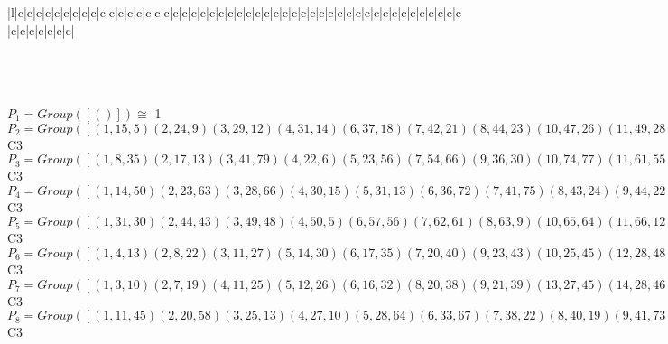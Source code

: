 \documentclass[varwidth=\maxdimen,border=10]{standalone}
\begin{document}
\begin{tabular}
\begin{array}{|l|c|c|c|c|c|c|c|c|c|c|c|c|c|c|c|c|c|c|c|c|c|c|c|c|c|c|c|c|c|c|c|c|c|c|c|c|c|c|c|c|c|c|c|c|c|c|c|c|c|c|c|c|c|c|c|c|}
\end{array}\)\\
\ \\
\ \\
$P_{1} = Group( [ () ] )\cong$ 1\ \\
$P_{2} = Group( [ ( 1,15, 5)( 2,24, 9)( 3,29,12)( 4,31,14)( 6,37,18)( 7,42,21)( 8,44,23)(10,47,26)(11,49,28)(13,50,30)(16,55,34)(17,57,36)(19,60,39)(20,62,41)(22,63,43)(25,65,46)(27,66,48)(32,69,52)(33,71,54)(35,72,56)(38,74,59)(40,75,61)(45,76,64)(51,78,68)(53,79,70)(58,80,73)(67,81,77) ] )\cong$ C3\ \\
$P_{3} = Group( [ ( 1, 8,35)( 2,17,13)( 3,41,79)( 4,22, 6)( 5,23,56)( 7,54,66)( 9,36,30)(10,74,77)(11,61,55)(12,62,53)(14,43,18)(15,44,72)(16,28,75)(19,78,64)(20,70,29)(21,71,27)(24,57,50)(25,80,52)(26,38,81)(31,63,37)(32,65,73)(33,48,42)(34,49,40)(39,51,76)(45,60,68)(46,58,69)(47,59,67) ] )\cong$ C3\ \\
$P_{4} = Group( [ ( 1,14,50)( 2,23,63)( 3,28,66)( 4,30,15)( 5,31,13)( 6,36,72)( 7,41,75)( 8,43,24)( 9,44,22)(10,46,76)(11,48,29)(12,49,27)(16,54,79)(17,56,37)(18,57,35)(19,59,80)(20,61,42)(21,62,40)(25,64,47)(26,65,45)(32,68,81)(33,70,55)(34,71,53)(38,73,60)(39,74,58)(51,77,69)(52,78,67) ] )\cong$ C3\ \\
$P_{5} = Group( [ ( 1,31,30)( 2,44,43)( 3,49,48)( 4,50, 5)( 6,57,56)( 7,62,61)( 8,63, 9)(10,65,64)(11,66,12)(13,15,14)(16,71,70)(17,72,18)(19,74,73)(20,75,21)(22,24,23)(25,76,26)(27,29,28)(32,78,77)(33,79,34)(35,37,36)(38,80,39)(40,42,41)(45,47,46)(51,81,52)(53,55,54)(58,60,59)(67,69,68) ] )\cong$ C3\ \\
$P_{6} = Group( [ ( 1, 4,13)( 2, 8,22)( 3,11,27)( 5,14,30)( 6,17,35)( 7,20,40)( 9,23,43)(10,25,45)(12,28,48)(15,31,50)(16,33,53)(18,36,56)(19,38,58)(21,41,61)(24,44,63)(26,46,64)(29,49,66)(32,51,67)(34,54,70)(37,57,72)(39,59,73)(42,62,75)(47,65,76)(52,68,77)(55,71,79)(60,74,80)(69,78,81) ] )\cong$ C3\ \\
$P_{7} = Group( [ ( 1, 3,10)( 2, 7,19)( 4,11,25)( 5,12,26)( 6,16,32)( 8,20,38)( 9,21,39)(13,27,45)(14,28,46)(15,29,47)(17,33,51)(18,34,52)(22,40,58)(23,41,59)(24,42,60)(30,48,64)(31,49,65)(35,53,67)(36,54,68)(37,55,69)(43,61,73)(44,62,74)(50,66,76)(56,70,77)(57,71,78)(63,75,80)(72,79,81) ] )\cong$ C3\ \\
$P_{8} = Group( [ ( 1,11,45)( 2,20,58)( 3,25,13)( 4,27,10)( 5,28,64)( 6,33,67)( 7,38,22)( 8,40,19)( 9,41,73)(12,46,30)(14,48,26)(15,49,76)(16,51,35)(17,53,32)(18,54,77)(21,59,43)(23,61,39)(24,62,80)(29,65,50)(31,66,47)(34,68,56)(36,70,52)(37,71,81)(42,74,63)(44,75,60)(55,78,72)(57,79,69) ] )\cong$ C3\ \\

\end{tabular}
\end{document}

